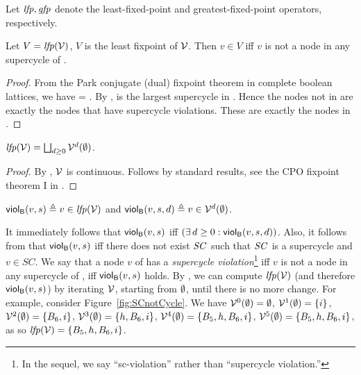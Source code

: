 Let $\MATHIDN{lfp}, \MATHIDN{gfp}$ denote the least-fixed-point and greatest-fixed-point operators, respectively.

\begin{proposition}  \label{prop:LFPisScViolations}
Let  $V= \lfp{\VFs}$, \ie $V$ is the least fixpoint of $\VFs$. Then $v \in V$ iff $v$ is not a node in any supercycle of .    
\end{proposition}
%
\begin{proof}
From the Park conjugate (dual) fixpoint theorem in complete boolean lattices, we have 
\lfp{\VFs} = \compl{\gfp{\SFs}}.
By  , \gfp{\SFs} is the largest supercycle in . Hence the nodes not in 
\gfp{\SFs} are exactly the nodes that have supercycle violations. These are exactly the nodes in \lfp{\VFs}.
\end{proof}


\begin{proposition}  \label{prop:computeLFP}
$\lfp{\VFs} = \JOIN_{d \ge 0} \VFs^{d} (\ewfg)$.
\end{proposition}
%
\begin{proof}
By , $\VFs$ is continuous. Follows by standard results, \eg see the CPO fixpoint theorem I in 
\cite{DP02}.
\end{proof}



\begin{definition}
\label{def:supercycle-violation}
\label{def:supercycle.violation}
\label{defn:supercycle.violation}
$\scV{v}{s} \df v \in \lfp{\VFs}$ and 
$\scVd{v}{d}{s} \df v \in \VFs^{d} (\ewfg)$.
\end{definition}
%
It immediately follows that $\scV{v}{s}$ iff  $(\ex d \ge 0: \scVd{v}{d}{s})$.
Also, it follows from  that $\scV{v}{s}$ iff there does not exist $\SC$ such that $\SC$ is a supercycle and $v \in SC$.
We say that a node $v$ of  has a \emph{supercycle violation}\footnote{In the sequel, we say ``sc-violation'' rather than ``supercycle violation.''} iff $v$ is not a node in any supercycle of , 
\ie iff $\scV{v}{s}$ holds. 
By , we can compute $\lfp{\VFs}$ (and therefore $\scV{v}{s}$) by iterating $\VFs$, starting from $\ewfg$, until there is no more change.
%
For example, consider Figure~\ref{fig:SCnotCycle}. We have 
$\VFs^{0} (\ewfg) = \ewfg$,
$\VFs^{1} (\ewfg) = \set{i}$, 
$\VFs^{2} (\ewfg) = \set{B_6, i}$, 
$\VFs^{3} (\ewfg) = \set{h, B_6, i}$, 
$\VFs^{4} (\ewfg) = \set{B_5, h, B_6, i}$, 
$\VFs^{5} (\ewfg) = \set{B_5, h, B_6, i}$, 
as so $\lfp{\VFs} = \set{B_5, h, B_6, i}$.


